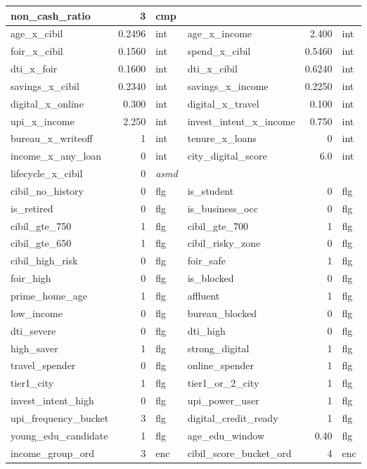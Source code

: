 \documentclass[12pt,a4paper]{article}
\begin{document}
\begin{longtable}{lrl|lrl}
non\_cash\_ratio & 3 & cmp & & & \\
\midrule
age\_x\_cibil & 0.2496 & int & age\_x\_income & 2.400 & int \\
foir\_x\_cibil & 0.1560 & int & spend\_x\_cibil & 0.5460 & int \\
dti\_x\_foir & 0.1600 & int & dti\_x\_cibil & 0.6240 & int \\
savings\_x\_cibil & 0.2340 & int & savings\_x\_income & 0.2250 & int \\
digital\_x\_online & 0.300 & int & digital\_x\_travel & 0.100 & int \\
upi\_x\_income & 2.250 & int & invest\_intent\_x\_income & 0.750 & int \\
bureau\_x\_writeoff & 1 & int & tenure\_x\_loans & 0 & int \\
income\_x\_any\_loan & 0 & int & city\_digital\_score & 6.0 & int \\
lifecycle\_x\_cibil & 0 & \textit{asmd} & & & \\
\midrule
cibil\_no\_history & 0 & flg & is\_student & 0 & flg \\
is\_retired & 0 & flg & is\_business\_occ & 0 & flg \\
cibil\_gte\_750 & 1 & flg & cibil\_gte\_700 & 1 & flg \\
cibil\_gte\_650 & 1 & flg & cibil\_risky\_zone & 0 & flg \\
cibil\_high\_risk & 0 & flg & foir\_safe & 1 & flg \\
foir\_high & 0 & flg & is\_blocked & 0 & flg \\
prime\_home\_age & 1 & flg & affluent & 1 & flg \\
low\_income & 0 & flg & bureau\_blocked & 0 & flg \\
dti\_severe & 0 & flg & dti\_high & 0 & flg \\
high\_saver & 1 & flg & strong\_digital & 1 & flg \\
travel\_spender & 0 & flg & online\_spender & 1 & flg \\
tier1\_city & 1 & flg & tier1\_or\_2\_city & 1 & flg \\
invest\_intent\_high & 0 & flg & upi\_power\_user & 1 & flg \\
upi\_frequency\_bucket & 3 & flg & digital\_credit\_ready & 1 & flg \\
young\_edu\_candidate & 1 & flg & age\_edu\_window & 0.40 & flg \\
\midrule
income\_group\_ord & 3 & enc & cibil\_score\_bucket\_ord & 4 & enc \\

\end{longtable}
\end{document}
